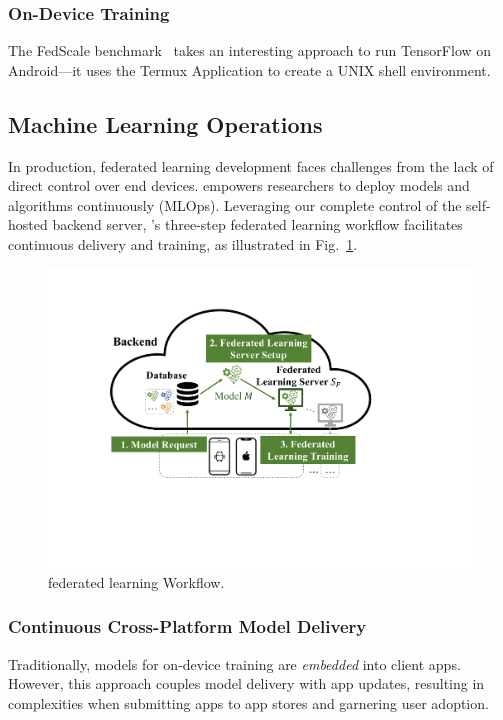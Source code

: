 \subsubsection{On-Device Training}

The FedScale benchmark~\cite{lai2022fedscale} takes an interesting approach to
run TensorFlow on Android---it uses the Termux Application to
create a UNIX shell environment.

\subsection{Machine Learning Operations}
\label{sec:mlops}

\newcommand{\model}{$M$}
\newcommand{\fs}{$S_\mathrm F$}
In production,
federated learning development faces challenges from
the lack of direct control over end devices.
\fedkit empowers researchers to deploy models and algorithms continuously (MLOps).
Leveraging our complete control of the self-hosted backend server,
\fedkit's three-step federated learning workflow
facilitates continuous delivery and training,
as illustrated in Fig.~\ref{fig:fl-workflow}.

\begin{figure}\begin{center}
    \includegraphics[width=0.7\linewidth]{fl_workflow.pdf}
    \caption{\fedkit federated learning Workflow.}
    \label{fig:fl-workflow}
\end{center}\end{figure}

\subsubsection{Continuous Cross-Platform Model Delivery}
Traditionally, models for on-device training are \textit{embedded} into client apps.
However, this approach couples model delivery with app updates,
resulting in complexities when submitting apps to app stores and garnering user adoption.

